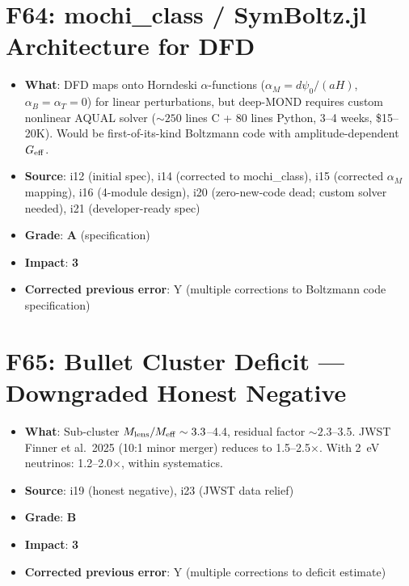 \documentclass[11pt,a4paper]{article}
\newcommand{\grade}[1]{\textbf{#1}}
\newcommand{\impact}[1]{\textbf{#1}}
\begin{document}
\section{F64: mochi\_class / SymBoltz.jl Architecture for DFD}
\begin{itemize}[nosep]
\item \textbf{What}: DFD maps onto Horndeski $\alpha$-functions ($\alpha_M = d\psi_0/(aH)$, $\alpha_B = \alpha_T = 0$) for linear perturbations, but deep-MOND requires custom nonlinear AQUAL solver ($\sim 250$ lines C + 80 lines Python, 3--4 weeks, \$15--20K). Would be first-of-its-kind Boltzmann code with amplitude-dependent $G_{\rm eff}$.
\item \textbf{Source}: i12 (initial spec), i14 (corrected to mochi\_class), i15 (corrected $\alpha_M$ mapping), i16 (4-module design), i20 (zero-new-code dead; custom solver needed), i21 (developer-ready spec)
\item \textbf{Grade}: \grade{A} (specification)
\item \textbf{Impact}: \impact{3}
\item \textbf{Corrected previous error}: Y (multiple corrections to Boltzmann code specification)
\end{itemize}

\section{F65: Bullet Cluster Deficit --- Downgraded Honest Negative}
\begin{itemize}[nosep]
\item \textbf{What}: Sub-cluster $M_{\rm lens}/M_{\rm eff} \sim 3.3$--4.4, residual factor $\sim 2.3$--3.5. JWST Finner et al.\ 2025 (10:1 minor merger) reduces to 1.5--2.5$\times$. With 2~eV neutrinos: 1.2--2.0$\times$, within systematics.
\item \textbf{Source}: i19 (honest negative), i23 (JWST data relief)
\item \textbf{Grade}: \grade{B}
\item \textbf{Impact}: \impact{3}
\item \textbf{Corrected previous error}: Y (multiple corrections to deficit estimate)
\end{itemize}
\end{document}
